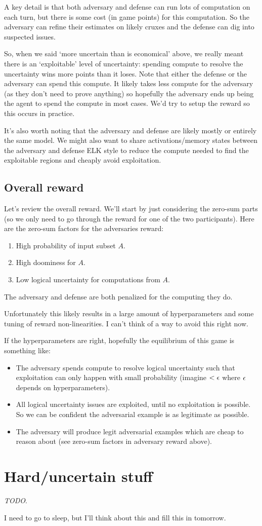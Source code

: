 \documentclass{pset}
\begin{document}
A key detail is that both adversary and defense can run lots of computation on
each turn, but there is some cost (in game points) for this computation. So the
adversary can refine their estimates on likely cruxes and the defense can dig
into suspected issues.

So, when we said `more uncertain than is economical' above, we really meant there is
an `exploitable' level of uncertainty: spending compute to resolve the uncertainty
wins more points than it loses. Note that either the defense or the adversary
can spend this compute. It likely takes less compute for the adversary (as they
don't need to prove anything) so hopefully the adversary ends up being the
agent to spend the compute in most cases. We'd try to setup the reward so
this occurs in practice.

It's also worth noting that the adversary and defense are likely mostly or
entirely the same model. We might also want to share activations/memory states
between the adversary and defense ELK style to reduce the compute needed to
find the exploitable regions and cheaply avoid exploitation.

\subsection{Overall reward}

Let's review the overall reward. We'll start by just considering the zero-sum
parts (so we only need to go through the reward for one of the two
participants).
Here are the zero-sum factors for the adversaries reward:
\begin{enumerate}
  \item High probability of input subset $A$.
  \item High doominess for $A$.
  \item Low logical uncertainty for computations from $A$.
\end{enumerate}

The adversary and defense are both penalized for the computing they do.

Unfortunately this likely results in a large amount of hyperparameters and some
tuning of reward non-linearities. I can't think of a way to avoid this right
now.

If the hyperparameters are right, hopefully the equilibrium of this game is something like:
\begin{itemize}
  \item The adversary spends compute to resolve logical uncertainty such that
    exploitation can only happen with small probability (imagine $< \epsilon$ where
    $\epsilon$ depends on hyperparameters).
  \item All logical uncertainty issues are exploited, until no exploitation is
    possible. So we can be confident the adversarial example is as legitimate
    as possible.
  \item The adversary will produce legit adversarial examples which are cheap to
    reason about (see zero-sum factors in adversary reward above).
\end{itemize}


\section{Hard/uncertain stuff}

\textit{TODO}.

I need to go to sleep, but I'll think about this and fill this in tomorrow.
\end{document}
